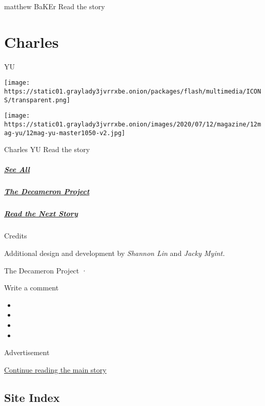matthew BaKEr Read the story

\href{https://www.nytimes3xbfgragh.onion/interactive/2020/07/07/magazine/charles-yu-short-story.html}{}

\hypertarget{charles}{%
\section{Charles}\label{charles}}

YU

\texttt{[image: https://static01.graylady3jvrrxbe.onion/packages/flash/multimedia/ICONS/transparent.png]}

\texttt{[image: https://static01.graylady3jvrrxbe.onion/images/2020/07/12/magazine/12mag-yu/12mag-yu-master1050-v2.jpg]}

Charles YU Read the story

\hypertarget{see-all}{%
\subparagraph{\texorpdfstring{\href{https://www.nytimes3xbfgragh.onion/interactive/2020/07/07/magazine/decameron-project-short-story-collection.html}{See
All}}{See All}}\label{see-all}}

\hypertarget{the-decameron-project-1}{%
\subparagraph{\texorpdfstring{\href{https://www.nytimes3xbfgragh.onion/interactive/2020/07/07/magazine/decameron-project-short-story-collection.html}{The
Decameron
Project}}{The Decameron Project}}\label{the-decameron-project-1}}

\hypertarget{read-the-next-story}{%
\subparagraph{\texorpdfstring{\href{https://www.nytimes3xbfgragh.onion/interactive/2020/07/07/magazine/mia-cuoto-short-story.html}{Read
the Next Story}}{Read the Next Story}}\label{read-the-next-story}}

Credits

Additional design and development by \emph{Shannon Lin} and \emph{Jacky
Myint.}

The Decameron Project ·

Write a comment

\begin{itemize}
\item
\item
\item
\item
\end{itemize}

Advertisement

\protect\hyperlink{after-bottom}{Continue reading the main story}

\hypertarget{site-index}{%
\subsection{Site Index}\label{site-index}}

